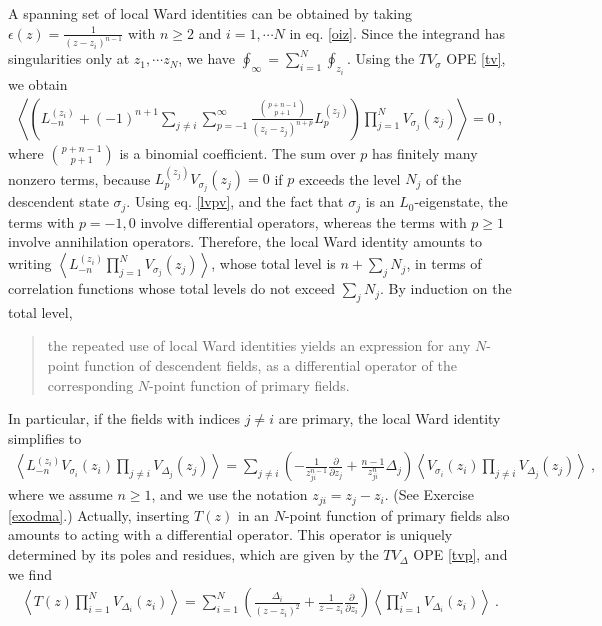 \documentclass[12pt, a4paper, notitlepage, twoside]{report}
\numberwithin{equation}{section}
\theoremstyle{break}
\begin{document}
A spanning set of local Ward identities can be obtained by taking $\epsilon(z) = \frac{1}{(z-z_i)^{n-1}}$ with $n\geq 2$ and $i=1, \cdots N$ in eq. \eqref{oiz}. 
Since the integrand has singularities only at $z_1,\cdots z_N$, we have $\oint_\infty=\sum_{i=1}^N \oint_{z_i}$.
Using the 
$TV_\sigma$ OPE \eqref{tv}, we obtain
\begin{align}
 \left\langle \left( L_{-n}^{(z_i)} + (-1)^{n+1}\sum_{j\neq i}\sum_{p=-1}^\infty \frac{\binom{p+n-1}{p+1}}{(z_i-z_j)^{n+p}} L_p^{(z_j)}\right)  \prod_{j=1}^N V_{\sigma_j}(z_j) \right\rangle = 0\ ,
\label{lwi}
\end{align}
where $\binom{p+n-1}{p+1}$ is a binomial coefficient.
The sum over $p$ has finitely many nonzero terms, because $L_p^{(z_j)}V_{\sigma_j}(z_j)=0$ if $p$ exceeds the level $N_j$ of the descendent state $\sigma_j$. 
Using eq. \eqref{lvpv}, and the fact that $\sigma_j$ is an $L_0$-eigenstate, the terms with $p=-1,0$ involve differential operators, whereas the terms with $p\geq 1$ involve annihilation operators. 
Therefore, the local Ward identity amounts to writing $\left\langle  L_{-n}^{(z_i)} \prod_{j=1}^N V_{\sigma_j}(z_j) \right\rangle$, whose total level is $n+\sum_j N_j$, in terms of correlation functions whose total levels do not exceed $\sum_jN_j$. By induction on the total level,
\begin{quote}
 the repeated use of local Ward identities yields an expression for any $N$-point function of descendent fields, as a differential operator of the corresponding $N$-point function of primary fields.
\end{quote}
In particular, if the fields with indices $j\neq i$ are primary, the local Ward identity simplifies to
\begin{align}
 \boxed{\left\langle L_{-n}^{(z_i)}V_{\sigma_i}(z_i)\prod_{j\neq i} V_{\Delta_j}(z_j) \right\rangle =
\sum_{j\neq i} \left(-\frac{1}{z_{ji}^{n-1}} {\frac{\partial}{\partial z_j}}  + \frac{n-1}{z_{ji}^n} \Delta_j\right)
\left\langle V_{\sigma_i}(z_i)\prod_{j\neq i} V_{\Delta_j}(z_j) \right\rangle} \ ,
\label{lmn}
\end{align}
where we assume $n\geq 1$, and we use the notation $z_{ji}=z_j-z_i$. (See Exercise \ref{exodma}.) Actually, inserting $T(z)$ in an $N$-point function of primary fields also amounts to acting with a differential operator. This operator is uniquely determined by its poles and residues, which are given by the $TV_\Delta$ OPE \eqref{tvp}, and we find
\begin{align}
 \boxed{\left\langle T(z) \prod_{i=1}^N V_{\Delta_i}(z_i)\right\rangle = \sum_{i=1}^N \left(\frac{\Delta_i}{(z-z_i)^2} + \frac{1}{z-z_i}{\frac{\partial}{\partial z_i}}\right)\left\langle  \prod_{i=1}^N V_{\Delta_i}(z_i)\right\rangle }\ .
\label{dtz}
\end{align}
\end{document}
